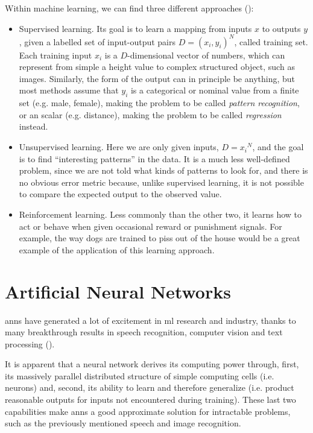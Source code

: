 Within machine learning, we can find three different approaches (\cite{kevin_p_murphy_book}):
\begin{itemize}
	\item Supervised learning. Its goal is to learn a mapping from inputs $x$ to outputs $y$, given a labelled set of input-output pairs $D={(x_i ,y_i)}^N$, called training set. Each training input $x_i$ is a $D$-dimensional vector of numbers, which can represent from simple a height value to complex structured object, such as images. Similarly, the form of the output can in principle be anything, but most methods assume that $y_i$ is a categorical or nominal value from a finite set (e.g. male, female), making the problem to be called \textit{pattern recognition}, or an scalar (e.g. distance), making the problem to be called \textit{regression} instead.  

	\item Unsupervised learning. Here we are only given inputs, $D={x_i}^N$, and the goal is to find “interesting patterns” in the data. It is a much less well-defined problem, since we are not told what kinds of patterns to look for, and there is no obvious error metric because, unlike supervised learning, it is not possible to compare the expected output to the observed value. 

	\item Reinforcement learning. Less commonly than the other two, it learns how to act or behave when given occasional reward or punishment signals. For example, the way dogs are trained to piss out of the house would be a great example of the application of this learning approach.  
\end{itemize}


                                        

\section{Artificial Neural Networks}
\glspl{ann} have generated a lot of excitement in \gls{ml} research and industry, thanks to many breakthrough results in speech recognition, computer vision and text processing (\cite{intro_ann}). 

It is apparent that a neural network derives its computing power through, first, its massively parallel distributed structure of simple computing cells (i.e. neurons) and, second, its ability to learn and therefore generalize (i.e. product reasonable outputs for inputs not encountered during training). These last two capabilities make \glspl{ann} a good approximate solution for intractable problems, such as the previously mentioned speech and image recognition.


